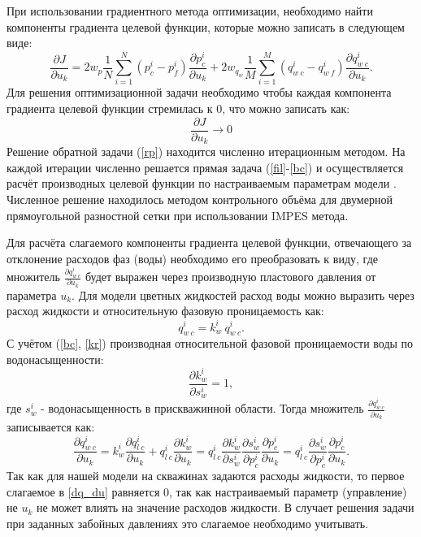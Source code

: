 \documentclass{article}
\begin{document}
При использовании градиентного метода оптимизации, необходимо найти компоненты градиента целевой функции, которые можно записать в следующем виде:
\begin{equation}
\frac{\partial J}{\partial u_k} = 2w_p\frac{1}{N}\sum_{i=1}^N ({p_c^i-p_f^i})\frac{\partial p_c^i}{\partial u_k}+2w_{q_w}\frac{1}{M}\sum_{i=1}^M{\left(q_{w\:c}^i-q_{w\:f}^i\right)}\frac{\partial q_{w\:c}^i}{\partial u_k}.
\end{equation}
Для решения оптимизационной задачи необходимо чтобы каждая компонента градиента целевой функции стремилась к 0, что можно записать как:
\begin{equation} \label{rp}
	 \frac{\partial J}{\partial u_k} \rightarrow 0
\end{equation}
Решение обратной задачи (\ref{rp}) находится численно итерационным методом. На каждой итерации численно решается прямая задача (\ref{fil}-\ref{bc}) и осуществляется расчёт производных целевой функции по настраиваемым параметрам модели \cite{opt}. Численное решение находилось методом контрольного объёма  для двумерной прямоугольной разностной сетки при использовании IMPES метода.

Для расчёта слагаемого компоненты градиента целевой функции, отвечающего за отклонение расходов фаз (воды) необходимо его преобразовать к виду, где множитель $\frac{\partial q_{w\:c}^i}{\partial u_k}$ будет выражен через производную пластового давления от параметра $u_k$. Для модели цветных жидкостей расход воды можно выразить через расход жидкости и относительную фазовую проницаемость как:
 \begin{equation*}
 	q_{w\:c}^i = k_{w}^i \: q_{w\:c}^i.
 \end{equation*}
С учётом (\ref{bc}, \ref{kr}) производная относительной фазовой проницаемости воды по водонасыщенности:
 \begin{equation*}
	\frac{\partial k_{w}^i}{\partial s_w^i} = 1,
\end{equation*}
где $s_w^i$ - водонасыщенность в прискважинной области.
Тогда множитель $\frac{\partial q_{w\:c}^i}{\partial u_k}$ записывается как:
\begin{equation} \label{dq_du}
\frac{\partial q_{w\:c}^i}{\partial u_k} = k_{w}^i \frac{\partial q_{l\:c}^i}{\partial u_k} + q_{l\:c}^i \frac{\partial k_{w}^i}{\partial u_k} = q_{l\:c}^i \frac{\partial k_{w}^i}{\partial s_w^i} \frac{\partial s_w^i}{\partial p_c^i}\frac{\partial p_c^i}{\partial u_k} =  q_{l\:c}^i  \frac{\partial s_w^i}{\partial p_c^i}\frac{\partial p_c^i}{\partial u_k}.
\end{equation}
Так как для нашей модели на скважинах задаются расходы жидкости, то первое слагаемое в \ref{dq_du} равняется 0, так как настраиваемый параметр (управление) не $u_k$ не может влиять на значение расходов жидкости. В случает решения задачи при заданных забойных давлениях это слагаемое необходимо учитывать.
\end{document}
